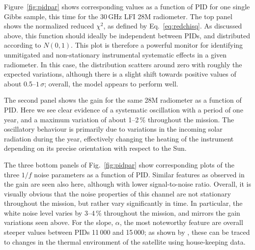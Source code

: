 \documentclass[twocolumn]{aa}
\renewcommand{\d}[0]{\vec{d}}
\newcommand{\s}[0]{\vec{s}}
\newcommand{\BP}{\textsc{BeyondPlanck}}
\begin{document}
Figure~\ref{fig:pidpar} shows corresponding values as a function of
PID for one single Gibbs sample, this time for the 30\,GHz LFI 28M
radiometer. The top panel shows the normalized reduced $\chi^2$, as
defined by Eq.~\eqref{eq:redchisq}. As discussed above, this function
should ideally be independent between PIDs, and distributed according
to $N(0,1)$. This plot is therefore a powerful monitor for identifying
unmitigated and non-stationary instrumental systematic effects in a
given radiometer. In this case, the distribution scatters around zero
with roughly the expected variations, although there is a slight shift
towards positive values of about 0.5--$1\,\sigma$; overall, the model
appears to perform well.


The second panel shows the gain for the same 28M radiometer as a
function of PID. Here we see clear evidence of a systematic
oscillation with a period of one year, and a maximum variation of
about 1--2\,\% throughout the mission. The oscillatory behaviour is
primarily due to variations in the incoming solar radiation during the
year, effectively changing the heating of the instrument depending on its
precise orientation with respect to the Sun.

The three bottom panels of Fig.~\ref{fig:pidpar} show corresponding
plots of the three $1/f$ noise parameters as a function of
PID. Similar features as observed in the gain are seen also here,
although with lower signal-to-noise ratio. Overall, it is visually
obvious that the noise properties of this channel are not stationary
throughout the mission, but rather vary significantly in time. In
particular, the white noise level varies by 3--4\,\% throughout the
mission, and mirrors the gain variations seen above. For the slope,
$\alpha$, the most noteworthy feature are overall steeper values
between PIDs 11\,000 and 15\,000; as shown by \citet{bp06}, these can
be traced to changes in the thermal environment of the satellite using
house-keeping data.
\end{document}
